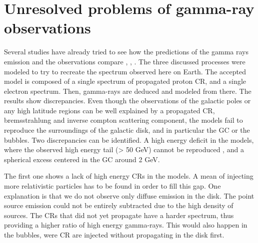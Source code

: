 \section{Unresolved problems of gamma-ray observations}
%	
%


%
%
%

Several studies have already tried to see how the predictions of the gamma rays emission and the observations compare \cite{Calore2015}, \cite{Fermi2017}, \cite{Yang2016}. The three discussed processes were modeled to try to recreate the spectrum observed here on Earth. The accepted model is composed of a single spectrum of propagated proton CR, and a single electron spectrum. Then, gamma-rays are deduced and modeled from there. The results show discrepancies.
Even though the observations of the galactic poles or any high latitude regions can be well explained by a propagated CR, bremsstrahlung and inverse compton scattering component, the models fail to reproduce the surroundings of the galactic disk, and in particular the GC or the bubbles. 
Two discrepancies can be identified. A high energy deficit in the models, where the observed high energy tail (> 50 GeV) cannot be reproduced \cite{Yang2016}, and a spherical excess centered in the GC around 2 GeV.

The first one shows a lack of high energy CRs in the models. A mean of injecting more relativistic particles has to be found in order to fill this gap. One explanation is that we do not observe only diffuse emission in the disk. The point source emission could not be entirely subtracted due to the high density of sources. The CRs that did not yet propagate have a harder spectrum, thus providing a higher ratio of high energy gamma-rays. This would also happen in the bubbles, were CR are injected without propagating in the disk first.

